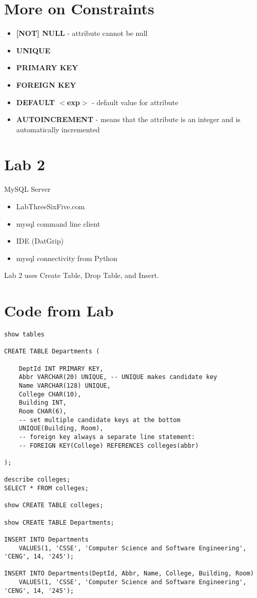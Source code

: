 \documentclass[twoside]{article}
\begin{document}
\section*{More on Constraints}
\begin{itemize}
    \item \textbf{[NOT] NULL} - attribute cannot be null
    \item \textbf{UNIQUE}
    \item \textbf{PRIMARY KEY}
    \item \textbf{FOREIGN KEY}
    \item \textbf{DEFAULT $<$exp$>$} - default value for attribute
    \item \textbf{AUTO\textunderscore INCREMENT} - means that the attribute is an integer 
    and is automatically incremented
\end{itemize}

\section*{Lab 2}
MySQL Server
\begin{itemize}
    \item LabThreeSixFive.com
    \item mysql command line client
    \item IDE (DatGrip)
    \item mysql connectivity from Python
\end{itemize}

Lab 2 uses Create Table, Drop Table, and Insert.

\section*{Code from Lab}
\begin{verbatim}
show tables

CREATE TABLE Departments (
    
    DeptId INT PRIMARY KEY, 
    Abbr VARCHAR(20) UNIQUE, -- UNIQUE makes candidate key
    Name VARCHAR(128) UNIQUE,
    College CHAR(10),
    Building INT,
    Room CHAR(6),
    -- set multiple candidate keys at the bottom
    UNIQUE(Building, Room),
    -- foreign key always a separate line statement:
    -- FOREIGN KEY(College) REFERENCES colleges(abbr)
    
);

describe colleges;
SELECT * FROM colleges;

show CREATE TABLE colleges;

show CREATE TABLE Departments;

INSERT INTO Departments 
    VALUES(1, 'CSSE', 'Computer Science and Software Engineering', 'CENG', 14, '245');
    
INSERT INTO Departments(DeptId, Abbr, Name, College, Building, Room)
    VALUES(1, 'CSSE', 'Computer Science and Software Engineering', 'CENG', 14, '245');

\end{verbatim}
\end{document}
